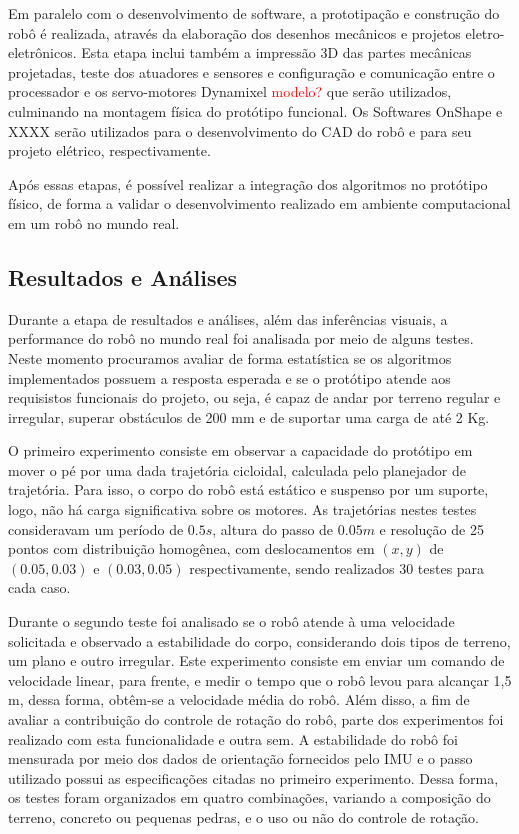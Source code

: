\documentclass[../main.tex]{subfiles}
\begin{document}
  Em paralelo com o desenvolvimento de software, a prototipação e construção do robô é realizada, através da elaboração dos desenhos mecânicos e projetos eletro-eletrônicos. Esta etapa inclui também a impressão 3D das partes mecânicas projetadas, teste dos atuadores e sensores e configuração e comunicação entre o processador e os servo-motores Dynamixel \textcolor{red}{modelo?} que serão utilizados, culminando na montagem física do protótipo funcional. Os Softwares OnShape e XXXX serão utilizados para o desenvolvimento do CAD do robô e para seu projeto elétrico, respectivamente.

  Após essas etapas, é possível realizar a integração dos algoritmos no protótipo físico, de forma a validar o desenvolvimento realizado em ambiente computacional em um robô no mundo real.

  \subsection{Resultados e Análises}
  Durante a etapa de resultados e análises, além das inferências visuais, a performance do robô no mundo real foi analisada por meio de alguns testes. Neste momento procuramos avaliar de forma estatística se os algoritmos implementados possuem a resposta esperada e se o protótipo atende aos requisistos funcionais do projeto, ou seja, é capaz de andar por terreno regular e irregular, superar obstáculos  de 200 mm e de suportar uma carga de até 2 Kg.

  O primeiro experimento consiste em observar a capacidade do protótipo em mover o pé por uma dada trajetória cicloidal, calculada pelo planejador de trajetória. Para isso, o corpo do robô está estático e suspenso por um suporte, logo, não há carga significativa sobre os motores. As trajetórias nestes testes consideravam um período de $0.5 s$, altura do passo de $0.05 m$ e resolução de 25 pontos com distribuição homogênea, com deslocamentos em $(x, y)$ de $(0.05, 0.03)$ e $(0.03, 0.05)$ respectivamente, sendo realizados 30 testes para cada caso.
  
  Durante o segundo teste foi analisado se o robô atende à uma velocidade solicitada e observado a estabilidade do corpo, considerando dois tipos de terreno, um plano e outro irregular. Este experimento consiste em enviar um comando de velocidade linear, para frente, e medir o tempo que o robô levou para alcançar 1,5 m, dessa forma, obtêm-se a velocidade média do robô.  Além disso, a fim de avaliar a contribuição do controle de rotação do robô, parte dos experimentos foi realizado com esta funcionalidade e outra sem. A estabilidade do robô foi mensurada por meio dos dados de orientação fornecidos pelo IMU e o passo utilizado possui as especificações citadas no primeiro experimento. Dessa forma, os testes foram organizados em quatro combinações, variando a composição do terreno, concreto ou pequenas pedras, e o uso ou não do controle de rotação.
  
\end{document}
